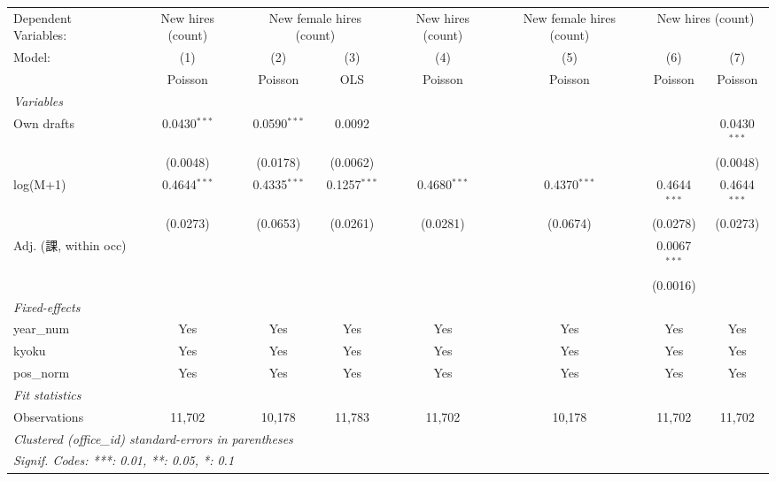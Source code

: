 
\begingroup
\centering
\begin{tabular}{lccccccc}
   \tabularnewline \midrule \midrule
   Dependent Variables: & New hires (count) & \multicolumn{2}{c}{New female hires (count)} & New hires (count) & New female hires (count) & \multicolumn{2}{c}{New hires (count)}\\
   Model:                 & (1)            & (2)            & (3)            & (4)            & (5)            & (6)            & (7)\\  
                          &  Poisson       & Poisson        & OLS            & Poisson        & Poisson        & Poisson        & Poisson\\  
   \midrule
   \emph{Variables}\\
   Own drafts             & 0.0430$^{***}$ & 0.0590$^{***}$ & 0.0092         &                &                &                & 0.0430$^{***}$\\   
                          & (0.0048)       & (0.0178)       & (0.0062)       &                &                &                & (0.0048)\\   
   log(M+1)               & 0.4644$^{***}$ & 0.4335$^{***}$ & 0.1257$^{***}$ & 0.4680$^{***}$ & 0.4370$^{***}$ & 0.4644$^{***}$ & 0.4644$^{***}$\\   
                          & (0.0273)       & (0.0653)       & (0.0261)       & (0.0281)       & (0.0674)       & (0.0278)       & (0.0273)\\   
   Adj. (課, within occ) &                &                &                &                &                & 0.0067$^{***}$ &   \\   
                          &                &                &                &                &                & (0.0016)       &   \\   
   \midrule
   \emph{Fixed-effects}\\
   year\_num              & Yes            & Yes            & Yes            & Yes            & Yes            & Yes            & Yes\\  
   kyoku                  & Yes            & Yes            & Yes            & Yes            & Yes            & Yes            & Yes\\  
   pos\_norm              & Yes            & Yes            & Yes            & Yes            & Yes            & Yes            & Yes\\  
   \midrule
   \emph{Fit statistics}\\
   Observations           & 11,702         & 10,178         & 11,783         & 11,702         & 10,178         & 11,702         & 11,702\\  
   \midrule \midrule
   \multicolumn{8}{l}{\emph{Clustered (office\_id) standard-errors in parentheses}}\\
   \multicolumn{8}{l}{\emph{Signif. Codes: ***: 0.01, **: 0.05, *: 0.1}}\\
\end{tabular}
\par\endgroup


